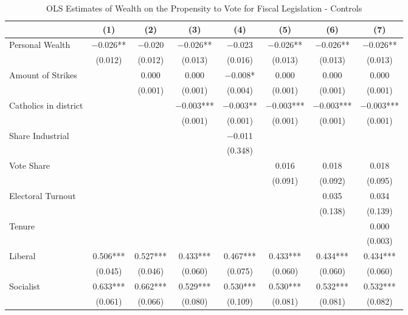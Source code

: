\begin{table}

\caption{\label{tab:ols_controls}OLS Estimates of Wealth on the Propensity to Vote for Fiscal Legislation - Controls}
\centering
\begin{tabular}[t]{lccccccc}
\toprule
  & (1) & (2) & (3) & (4) & (5) & (6) & (7)\\
\midrule
Personal Wealth & \num{-0.026}** & \num{-0.020} & \num{-0.026}** & \num{-0.023} & \num{-0.026}** & \num{-0.026}** & \num{-0.026}**\\
 & (\num{0.012}) & (\num{0.012}) & (\num{0.013}) & (\num{0.016}) & (\num{0.013}) & (\num{0.013}) & (\num{0.013})\\
Amount of Strikes &  & \num{0.000} & \num{0.000} & \num{-0.008}* & \num{0.000} & \num{0.000} & \num{0.000}\\
 &  & (\num{0.001}) & (\num{0.001}) & (\num{0.004}) & (\num{0.001}) & (\num{0.001}) & (\num{0.001})\\
Catholics in district &  &  & \num{-0.003}*** & \num{-0.003}** & \num{-0.003}*** & \num{-0.003}*** & \num{-0.003}***\\
 &  &  & (\num{0.001}) & (\num{0.001}) & (\num{0.001}) & (\num{0.001}) & (\num{0.001})\\
Share Industrial &  &  &  & \num{-0.011} &  &  & \\
 &  &  &  & (\num{0.348}) &  &  & \\
Vote Share &  &  &  &  & \num{0.016} & \num{0.018} & \num{0.018}\\
 &  &  &  &  & (\num{0.091}) & (\num{0.092}) & (\num{0.095})\\
Electoral Turnout &  &  &  &  &  & \num{0.035} & \num{0.034}\\
 &  &  &  &  &  & (\num{0.138}) & (\num{0.139})\\
Tenure &  &  &  &  &  &  & \num{0.000}\\
 &  &  &  &  &  &  & (\num{0.003})\\
Liberal & \num{0.506}*** & \num{0.527}*** & \num{0.433}*** & \num{0.467}*** & \num{0.433}*** & \num{0.434}*** & \num{0.434}***\\
 & (\num{0.045}) & (\num{0.046}) & (\num{0.060}) & (\num{0.075}) & (\num{0.060}) & (\num{0.060}) & (\num{0.060})\\
Socialist & \num{0.633}*** & \num{0.662}*** & \num{0.529}*** & \num{0.530}*** & \num{0.530}*** & \num{0.532}*** & \num{0.532}***\\
 & (\num{0.061}) & (\num{0.066}) & (\num{0.080}) & (\num{0.109}) & (\num{0.081}) & (\num{0.081}) & (\num{0.082})\\

\end{tabular}
\end{table}
